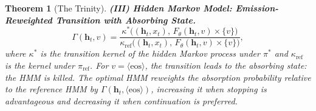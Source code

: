 \documentclass[11pt,a4paper]{article}
\theoremstyle{plain}
\newtheorem{theorem}{Theorem}[section]
\theoremstyle{definition}
\theoremstyle{remark}
\begin{document}
\begin{theorem}[The Trinity]
\medskip
\noindent\textbf{(III) Hidden Markov Model: Emission-Reweighted Transition
with Absorbing State.}
\begin{equation}\label{eq:trinity_hmm}
  \Gamma(\bm{h}_t, v)
  = \frac{\kappa^*\bigl((\bm{h}_t, x_t),\, F_\theta(\bm{h}_t, v) \times \{v\}\bigr)}%
         {\kappa_{\mathrm{ref}}\bigl((\bm{h}_t, x_t),\, F_\theta(\bm{h}_t, v) \times \{v\}\bigr)},
\end{equation}
where $\kappa^*$ is the transition kernel of the hidden Markov process under
$\pi^*$ and $\kappa_{\mathrm{ref}}$ is the kernel under $\pi_{\mathrm{ref}}$.
For $v = \langle\mathrm{eos}\rangle$, the transition leads to the
\emph{absorbing state}: the HMM is killed. The optimal HMM reweights
the absorption probability relative to the reference HMM by
$\Gamma(\bm{h}_t, \langle\mathrm{eos}\rangle)$, increasing it when
stopping is advantageous and decreasing it when continuation is preferred.
\end{theorem}
\end{document}
